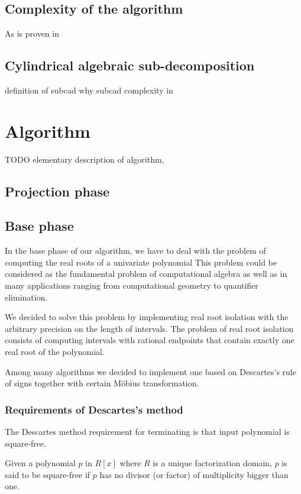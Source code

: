 \documentclass[
  digital, %
  twoside, %
  table,   %
  nolof,     %
  nolot,     %
]{fithesis3}
\begin{document}
\section{Complexity of the algorithm}
As is proven in 

\section{Cylindrical algebraic sub-decomposition}
definition of subcad why subcad complexity in 



\chapter{Algorithm}
TODO elementary description of algorithm, 
\section{Projection phase}
\section{Base phase}
In the base phase of our algorithm, we have to deal with the problem of computing the real roots of a univariate polynomial This problem  could be considered as the fundamental problem of computational algebra\parencite{yap2000fundamental} as well as in many applications ranging from computational geometry to quantifier elimination. 

We decided to solve this problem by implementing real root isolation with the arbitrary precision on the length of intervals. The problem of real root isolation consists of computing intervals with rational endpoints that contain exactly one real root of the polynomial.\parencite{10.1007/11841036_72}

Among many algorithms we decided to implement one based on Descartes's rule of signs together with certain Möbius transformation.

 \subsection{Requirements of Descartes's method}
 The Descartes method requirement for terminating is that input polynomial is square-free.\parencite{ganzha2005computer}
  \begin{definition}
 Given a polynomial $p$ in $R[x]$ where $R$ is a unique factorization domain, $p$ is said to be square-free if $p$ has no divisor (or factor) of multiplicity bigger than one.\parencite{Yun:1976:SDA:800205.806320}
\end{definition}
\end{document}
